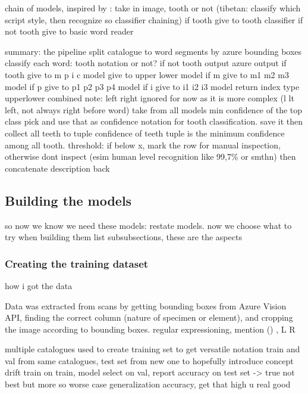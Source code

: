 \documentclass{article}
\begin{document}
chain of models, inspired by \cite{tibetan_ocr}: take in image, tooth or not
    (tibetan: classify which script style, then recognize so classifier chaining)
    if tooth give to tooth classifier 
    if not tooth give to basic word reader

summary: the pipeline
split catalogue to word segments by azure bounding boxes 
classify each word: tooth notation or not?
if not tooth output azure output
if tooth   
    give to m p i c model
    give to upper lower model 
    if m
        give to m1 m2 m3 model
    if p
        give to p1 p2 p3 p4 model
    if i
        give to i1 i2 i3 model
    return index type upperlower combined
    note: left right ignored for now as it is more complex (l lt left, not always right before word)
    take from all models min confidence of the top class pick and use that as confidence notation for 
    tooth classification. save it
then collect all teeth to tuple 
    confidence of teeth tuple is the minimum confidence among all tooth.
    threshold: if below x, mark the row for manual inspection, otherwise dont inspect (esim human level recognition like 99,7\% or smthn)
then concatenate description back       

\subsection{Building the models}

so now we know we need these models: restate models. now we choose what to try when building them
list subsubsections, these are the aspects

\subsubsection{Creating the training dataset}

how i got the data

Data was extracted from scans by getting bounding boxes from Azure Vision API,
finding the correct column (nature of specimen or element), and cropping the image 
according to bounding boxes.
regular expressioning, mention () , L R

multiple catalogues used to create training set to get versatile notation
train and val from same catalogues, test set from new one to hopefully introduce concept drift
    train on train, model select on val, report accuracy on test set -> true not best but more so worse case generalization accuracy, get that high u real good
\end{document}
